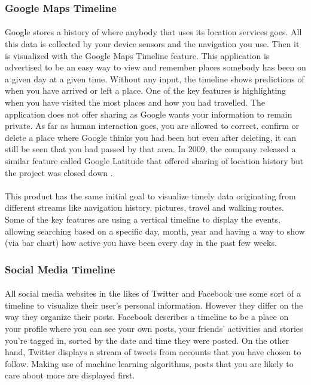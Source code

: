 \documentclass{l4proj}
\begin{document}
\subsubsection{Google Maps Timeline} 
\paragraph{}
Google stores a history of where anybody that uses its location services goes. All this data is collected by your device sensors and the navigation you use. Then it is visualized with the Google Maps Timeline \cite{GoogleMapsTimeline} feature. This application is advertised to be an easy way to view and remember places somebody has been on a given day at a given time. Without any input, the timeline shows predictions of when you have arrived or left a place. One of the key features is highlighting when you have visited the most places and how you had travelled. The application does not offer sharing as Google wants your information to remain private. As far as human interaction goes, you are allowed to correct, confirm or delete a place where Google thinks you had been but even after deleting,  it can still be seen that you had passed by that area. In 2009, the company released a similar feature called Google Latitude that offered sharing of location history but the project was closed down \cite{GMTimeFeature}.

\paragraph{}
This product has the same initial goal to visualize timely data originating from different streams like navigation history, pictures, travel and walking routes. Some of the key features are using a vertical timeline to display the events, allowing searching based on a specific day, month, year and having a way to show (via bar chart) how active you have been every day in the past few weeks. 

\subsubsection{Social Media Timeline}
\paragraph{}
All social media websites in the likes of Twitter and Facebook use some sort of a timeline to visualize their user's personal information. However they differ on the way they organize their posts. Facebook describes a timeline to be a place on your profile where you can see your own posts, your friends' activities and stories you're tagged in, sorted by the date and time they were posted. On the other hand, Twitter displays a stream of tweets from accounts that you have chosen to follow. Making use of machine learning algorithms, posts that you are likely to care about more are displayed first.
\end{document}

